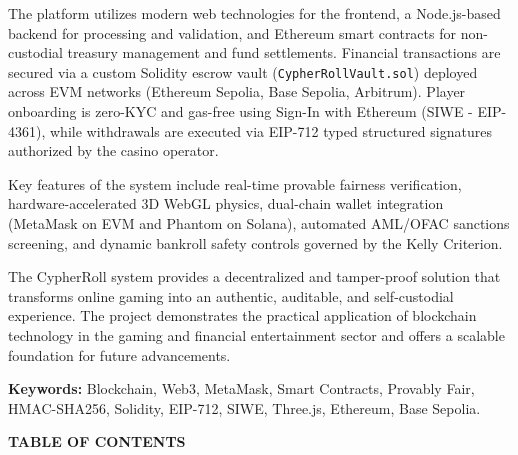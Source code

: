 The platform utilizes modern web technologies for the frontend, a Node.js-based backend for processing and validation, and Ethereum smart contracts for non-custodial treasury management and fund settlements. Financial transactions are secured via a custom Solidity escrow vault (\texttt{CypherRollVault.sol}) deployed across EVM networks (Ethereum Sepolia, Base Sepolia, Arbitrum). Player onboarding is zero-KYC and gas-free using Sign-In with Ethereum (SIWE - EIP-4361), while withdrawals are executed via EIP-712 typed structured signatures authorized by the casino operator.

Key features of the system include real-time provable fairness verification, hardware-accelerated 3D WebGL physics, dual-chain wallet integration (MetaMask on EVM and Phantom on Solana), automated AML/OFAC sanctions screening, and dynamic bankroll safety controls governed by the Kelly Criterion.

The CypherRoll system provides a decentralized and tamper-proof solution that transforms online gaming into an authentic, auditable, and self-custodial experience. The project demonstrates the practical application of blockchain technology in the gaming and financial entertainment sector and offers a scalable foundation for future advancements.

\vspace{0.8cm}
\noindent\textbf{Keywords:} Blockchain, Web3, MetaMask, Smart Contracts, Provably Fair, HMAC-SHA256, Solidity, EIP-712, SIWE, Three.js, Ethereum, Base Sepolia.

\newpage
\pagestyle{frontmatterstyle}
\thispagestyle{frontmatterstyle}
\begin{center}
    {\Large \textbf{TABLE OF CONTENTS}\par}
    \vspace{0.8cm}
\end{center}

